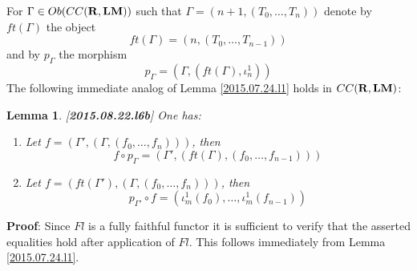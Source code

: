 \documentclass[11pt]{article}
\newenvironment{proof}{{\bf Proof}:}{\vskip 5mm }
\newtheorem{lemma}[proposition]{Lemma}
\newcommand{\llabel}[1]{\label{#1}[{\bf #1}]}
\newcommand{\rr}{{\bf R}}
\newcommand{\lm}{{\bf LM}}
\begin{document}
For $\Gamma\in Ob(CC(\rr,\lm))$ such that $\Gamma=(n+1,(T_0,\dots,T_n))$ denote by $ft(\Gamma)$ the object 
%
$$ft(\Gamma)=(n,(T_0,\dots,T_{n-1}))$$
%
and by $p_{\Gamma}$ the morphism 
%
$$p_{\Gamma}=(\Gamma, (ft(\Gamma), \iota_n^1))$$
%
The following immediate analog of Lemma \ref{2015.07.24.l1} holds in $CC(\rr,\lm)$:
%
\begin{lemma}
\llabel{2015.08.22.l6b}
One has:
%
\begin{enumerate}
\item Let $f=(\Gamma',(\Gamma,(f_0,\dots,f_n)))$, then 
%
$$f\circ p_{\Gamma}=(\Gamma',(ft(\Gamma),(f_0,\dots,f_{n-1})))$$
%
\item Let $f=(ft(\Gamma'),(\Gamma,(f_0,\dots,f_n)))$, then 
%
$$p_{\Gamma'}\circ f=(\iota_m^1(f_0),\dots,\iota_m^1(f_{n-1}))$$
%
\end{enumerate}
\end{lemma}
%
\begin{proof}
Since $Fl$ is a fully faithful functor it is sufficient to verify that the asserted equalities hold after application of $Fl$. This follows immediately from Lemma \ref{2015.07.24.l1}.
\end{proof}
%
\end{document}
